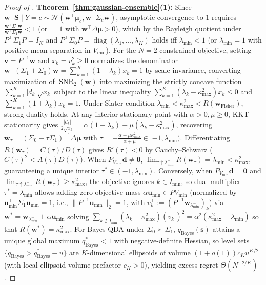 \documentclass[10pt]{article}
\theoremstyle{plain}
\theoremstyle{definition}
\theoremstyle{remark}
\newcommand{\SNR}{\operatorname{SNR}}
\begin{document}
\begin{proof}[Proof of ]
\textbf{Theorem~\ref{thm:gaussian-ensemble}(1):} Since $\mathbf{w}^\top \mathbf{S} \mid Y=c \sim \mathcal{N}(\mathbf{w}^\top \boldsymbol{\mu}_c, \mathbf{w}^\top \Sigma_c \mathbf{w})$, asymptotic convergence to $1$ requires $\frac{\mathbf{w}^\top \Sigma_0 \mathbf{w}}{\mathbf{w}^\top \Sigma_1 \mathbf{w}} < 1$ (or $=1$ with $\mathbf{w}^\top \Delta\boldsymbol{\mu} > 0$), which by the Rayleigh quotient under $P^\top \Sigma_1 P = I_K$ and $P^\top \Sigma_0 P = \operatorname{diag}(\lambda_1,\dots,\lambda_K)$ holds iff $\lambda_{\min} < 1$ (or $\lambda_{\min}=1$ with positive mean separation in $V_{\min}$). For the $N=2$ constrained objective, setting $\mathbf{v} = P^{-1}\mathbf{w}$ and $x_k = v_k^2 \ge 0$ normalizes the denominator $\mathbf{w}^\top(\Sigma_1+\Sigma_0)\mathbf{w} = \sum_{k=1}^K (1+\lambda_k) x_k = 1$ by scale invariance, converting maximization of $\SNR_2(\mathbf{w})$ into maximizing the strictly concave function $\sum_{k=1}^K |d_k|\sqrt{x_k}$ subject to the linear inequality $\sum_{k=1}^K (\lambda_k - \kappa_{\max}^2)x_k \le 0$ and $\sum_{k=1}^K (1+\lambda_k)x_k = 1$. Under Slater condition $\lambda_{\min} < \kappa_{\max}^2 < R(\mathbf{w}_{\mathrm{Fisher}})$, strong duality holds. At any interior stationary point with $\alpha > 0, \mu \ge 0$, KKT stationarity gives $\frac{|d_k|}{2\sqrt{x_k}} = \alpha(1+\lambda_k) + \mu(\lambda_k - \kappa_{\max}^2)$, recovering $\mathbf{w}_\tau = (\Sigma_0 - \tau\Sigma_1)^{-1}\Delta\boldsymbol{\mu}$ with $\tau = -\frac{\alpha - \mu\kappa_{\max}^2}{\alpha + \mu} \in [-1, \lambda_{\min})$. Differentiating $R(\mathbf{w}_\tau) = C(\tau)/D(\tau)$ gives $R'(\tau) < 0$ by Cauchy--Schwarz ($C(\tau)^2 < A(\tau)D(\tau)$). When $P_{V_{\min}}\mathbf{d} \neq \mathbf{0}$, $\lim_{\tau\uparrow\lambda_{\min}^-} R(\mathbf{w}_\tau) = \lambda_{\min} < \kappa_{\max}^2$, guaranteeing a unique interior $\tau^* \in (-1, \lambda_{\min})$. Conversely, when $P_{V_{\min}}\mathbf{d} = \mathbf{0}$ and $\lim_{\tau\uparrow\lambda_{\min}^-} R(\mathbf{w}_\tau) \ge \kappa_{\max}^2$, the objective ignores $k \in I_{\min}$, so dual multiplier $\tau^* = \lambda_{\min}$ allows adding zero-objective mass $\alpha\mathbf{u}_{\min} \in P V_{\min}$ (normalized by $\mathbf{u}_{\min}^\top \Sigma_1 \mathbf{u}_{\min} = 1$, i.e., $\|P^{-1}\mathbf{u}_{\min}\|_2 = 1$, with $v_k^\perp := (P^{-1}\mathbf{w}_{\lambda_{\min}^-})_k$) via $\mathbf{w}^* = \mathbf{w}_{\lambda_{\min}^-} + \alpha\mathbf{u}_{\min}$ solving $\sum_{k \notin I_{\min}}(\lambda_k - \kappa_{\max}^2)(v_k^\perp)^2 =\allowbreak \alpha^2(\kappa_{\max}^2 - \lambda_{\min})$ so that $R(\mathbf{w}^*) = \kappa_{\max}^2$. For Bayes QDA under $\Sigma_0 \succ \Sigma_1$, $q_{\mathrm{Bayes}}(\mathbf{s})$ attains a unique global maximum $q^*_{\mathrm{Bayes}} < 1$ with negative-definite Hessian, so level sets $\{q_{\mathrm{Bayes}} > q^*_{\mathrm{Bayes}} - u\}$ are $K$-dimensional ellipsoids of volume $(1+o(1))c_K u^{K/2}$ (with local ellipsoid volume prefactor $c_K > 0$), yielding excess regret $\Theta(N^{-2/K})$.


\end{proof}
\end{document}
